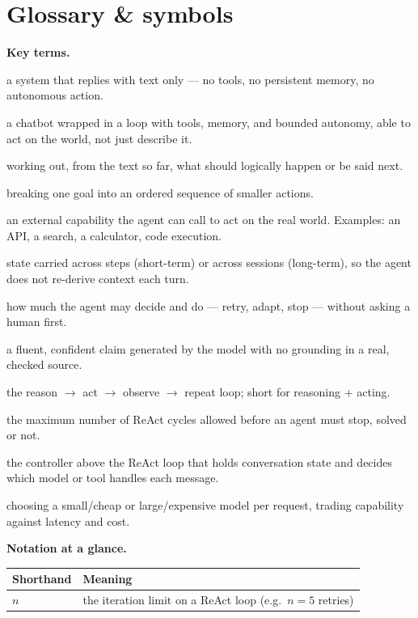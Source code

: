 \documentclass[a4paper,11pt]{article}
\begin{document}
\section*{Glossary \& symbols}

\noindent\textbf{Key terms.}
\begin{description}[leftmargin=9em,style=nextline,font=\normalfont\bfseries\color{navy}]
  \item[chatbot] a system that replies with text only --- no tools, no
    persistent memory, no autonomous action.
  \item[agent] a chatbot wrapped in a loop with tools, memory, and bounded
    autonomy, able to act on the world, not just describe it.
  \item[reasoning] working out, from the text so far, what should logically
    happen or be said next.
  \item[planning] breaking one goal into an ordered sequence of smaller
    actions.
  \item[tool] an external capability the agent can call to act on the real
    world. Examples: an API, a search, a calculator, code execution.
  \item[memory] state carried across steps (short-term) or across sessions
    (long-term), so the agent does not re-derive context each turn.
  \item[autonomy] how much the agent may decide and do --- retry, adapt,
    stop --- without asking a human first.
  \item[hallucination] a fluent, confident claim generated by the model with
    no grounding in a real, checked source.
  \item[ReAct] the reason $\to$ act $\to$ observe $\to$ repeat loop; short
    for reasoning + acting.
  \item[iteration limit] the maximum number of ReAct cycles allowed before
    an agent must stop, solved or not.
  \item[orchestrator] the controller above the ReAct loop that holds
    conversation state and decides which model or tool handles each
    message.
  \item[model selection] choosing a small/cheap or large/expensive model per
    request, trading capability against latency and cost.
\end{description}

\medskip
\noindent\textbf{Notation at a glance.}
\begin{center}\small
\begin{tabular}{@{}ll@{}}
\toprule
\textbf{Shorthand} & \textbf{Meaning} \\
\midrule
$n$ & the iteration limit on a ReAct loop (e.g.\ $n = 5$ retries) \\
\bottomrule
\end{tabular}
\end{center}
\end{document}
